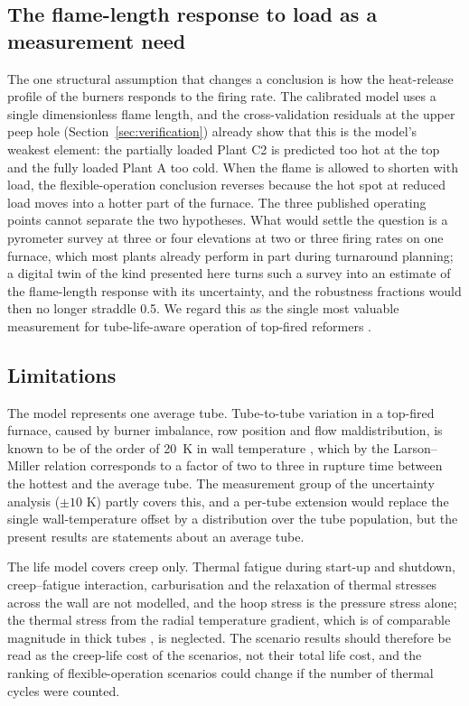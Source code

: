\subsection{The flame-length response to load as a measurement need}

The one structural assumption that changes a conclusion is how the heat-release profile of the burners responds to the firing rate.
The calibrated model uses a single dimensionless flame length, and the cross-validation residuals at the upper peep hole
(Section~\ref{sec:verification}) already show that this is the model's weakest element: the partially loaded Plant C2 is predicted
too hot at the top and the fully loaded Plant A too cold. When the flame is allowed to shorten with load, the flexible-operation
conclusion reverses because the hot spot at reduced load moves into a hotter part of the furnace. The three published operating
points cannot separate the two hypotheses. What would settle the question is a pyrometer survey at three or four elevations at two
or three firing rates on one furnace, which most plants already perform in part during turnaround planning; a digital twin of the
kind presented here turns such a survey into an estimate of the flame-length response with its uncertainty, and the robustness
fractions would then no longer straddle 0.5. We regard this as the single most valuable measurement for tube-life-aware operation of
top-fired reformers .

\subsection{Limitations}

The model represents one average tube. Tube-to-tube variation in a top-fired furnace, caused by burner imbalance, row position and
flow maldistribution, is known to be of the order of \SI{20}{K} in wall temperature , which by the Larson--Miller relation corresponds to a factor of two to three in rupture time between the
hottest and the average tube. The measurement group of the uncertainty analysis ($\pm 10$ K) partly covers this, and a per-tube
extension would replace the single wall-temperature offset by a distribution over the tube population, but the present results are
statements about an average tube.

The life model covers creep only. Thermal fatigue during start-up and shutdown, creep--fatigue interaction, carburisation and the
relaxation of thermal stresses across the wall are not modelled, and the hoop stress is the pressure stress alone; the thermal
stress from the radial temperature gradient, which is of comparable magnitude in thick tubes , is neglected. The scenario results should therefore be read as the creep-life cost of the scenarios,
not their total life cost, and the ranking of flexible-operation scenarios could change if the number of thermal cycles were
counted.

